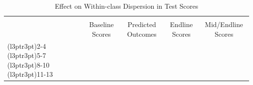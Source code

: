 \begin{table}[!h]
\centering\centering
\caption{Effect on Within-class Dispersion in Test Scores}
\centering
\begin{threeparttable}
\fontsize{9}{11}\selectfont
\begin{tabular}[t]{lccccccccclcc}
\toprule
\multicolumn{10}{c}{ } \\

\multicolumn{1}{c}{ } & \multicolumn{3}{c}{Baseline Scores} & \multicolumn{3}{c}{Predicted Outcomes} & \multicolumn{3}{c}{Endline Scores} & \multicolumn{3}{c}{Mid/Endline Scores} \\
\cmidrule(l{3pt}r{3pt}){2-4} \cmidrule(l{3pt}r{3pt}){5-7} \cmidrule(l{3pt}r{3pt}){8-10} \cmidrule(l{3pt}r{3pt}){11-13}
\multicolumn{10}{c}{ } \\


\end{tabular}
\end{threeparttable}
\end{table}

